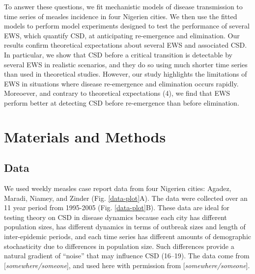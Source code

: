 \documentclass[3p]{elsarticle} %
\begin{document}
To answer these questions, we fit mechanistic models of disease
transmission to time series of measles incidence in four Nigerien
cities. We then use the fitted models to perform model experiments
designed to test the performance of several EWS, which quantify CSD, at
anticipating re-emergence and elimination. Our results confirm
theoretical expectations about several EWS and associated CSD. In
particular, we show that CSD before a critical transition is detectable
by several EWS in realistic scenarios, and they do so using much shorter
time series than used in theoretical studies. However, our study
highlights the limitations of EWS in situations where disease
re-emergence and elimination occurs rapidly. Moreoever, and contrary to
theoretical expectations (4), we find that EWS perform better at
detecting CSD before re-emergence than before elimination.

\hypertarget{materials-and-methods}{%
\section{Materials and Methods}\label{materials-and-methods}}

\hypertarget{data}{%
\subsection{Data}\label{data}}

We used weekly measles case report data from four Nigerien cities:
Agadez, Maradi, Niamey, and Zinder (Fig. \ref{data-plot}A). The data
were collected over an 11 year period from 1995-2005 (Fig.
\ref{data-plot}B). These data are ideal for testing theory on CSD in
disease dynamics because each city has different population sizes, has
different dynamics in terms of outbreak sizes and length of
inter-epidemic periods, and each time series has different amounts of
demographic stochasticity due to differences in population size. Such
differences provide a natural gradient of ``noise'' that may influence
CSD (16--19). The data come from {[}\emph{somewhere/someone}{]}, and
used here with permission from {[}\emph{somewhere/someone}{]}.
\end{document}
